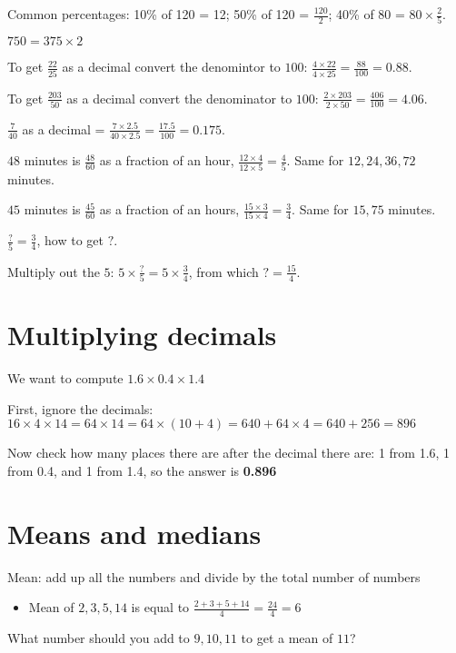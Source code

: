 \documentclass[fullpage,twocolumn]{article}
\begin{document}
Common percentages: 10\% of 120 = 12; 50\% of 120 = $\frac{120}{2}$; 
40\% of 80 = $80 \times \frac{2}{5}$.

$750 =  375 \times 2$

To get $\frac{22}{25}$ as a decimal convert the 
denomintor to $100$: $\frac{4\times 22}{4\times 25} = \frac{88}{100} = 0.88$.

To get $\frac{203}{50}$ as a decimal convert the 
denominator to $100$: $\frac{2 \times 203}{2 \times 50} = \frac{406}{100} = 4.06$.

$\frac{7}{40}$ as a decimal = $\frac{7 \times 2.5 }{40 \times 2.5} = \frac{17.5}{100} = 0.175$.

$48$ minutes is $\frac{48}{60}$ as a fraction of an hour, $\frac{12\times 4 }{12 \times 5} = \frac{4}{5}$. Same for $12, 24, 36, 72$ minutes.

$45$ minutes is $\frac{45}{60}$ as a fraction of an hours, $\frac{15 \times 3}{15 \times 4} = \frac{3}{4}$. Same for $15, 75$ minutes.


$\frac{?}{5} = \frac{3}{4}$, how to get $?$.

Multiply out the $5$: $5 \times \frac{?}{5} =  5 \times \frac{3}{4}$,
from which $? = \frac{15}{4}$.


\section{Multiplying decimals}

We want to compute $1.6 \times 0.4 \times 1.4$

First, ignore the decimals:
$16 \times 4 \times 14 = 64 \times 14 = 64 \times (10 + 4) = 640 + 64 \times 4 = 640 + 256 = 896$

Now check how many places there are after the decimal there are: 1 from 1.6, 1 from 0.4, and 1 from 1.4,
so the answer is {\bf 0.896}

\section{Means and medians}

Mean: add up all the numbers and divide by the total number of numbers
\begin{itemize}
\item Mean of $2,3,5,14$ is equal to $\frac{2+3+5+14}{4} = \frac{24}{4} = 6$
\end{itemize} 

What number should you add to $9,10,11$ to get a mean of $11$?
\end{document}
